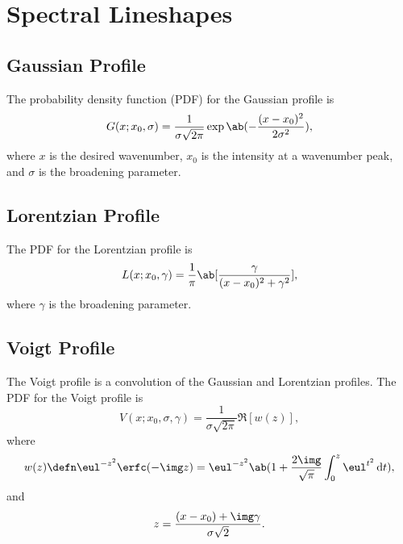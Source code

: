 \chapter{Spectral Lineshapes}
\label{c:spectral_lineshapes}

\section{Gaussian Profile}
\label{s:gaussian_profile}

The probability density function (PDF) for the Gaussian profile is
\begin{equation*}
    G(x; x_0, \sigma) = \frac{1}{\sigma\sqrt{2\pi}}\exp\ab(-\frac{(x - x_0)^2}{2\sigma^2}),
\end{equation*}
where $x$ is the desired wavenumber, $x_0$ is the intensity at a wavenumber peak, and $\sigma$ is the broadening parameter.

\section{Lorentzian Profile}
\label{s:lorentzian_profile}

The PDF for the Lorentzian profile is
\begin{equation*}
    L(x; x_0, \gamma) = \frac{1}{\pi}\ab[\frac{\gamma}{(x - x_0)^2 + \gamma^2}],
\end{equation*}
where $\gamma$ is the broadening parameter.

\section{Voigt Profile}
\label{s:voigt_profile}

The Voigt profile is a convolution of the Gaussian and Lorentzian profiles. The PDF for the Voigt profile is
\begin{equation*}
    V(x; x_0, \sigma, \gamma) = \frac{1}{\sigma\sqrt{2\pi}}\Re[w(z)],
\end{equation*}
where
\begin{equation*}
    w(z) \defn \eul^{-z^2}\erfc(-\img z) = \eul^{-z^2}\ab(1 + 
    \frac{2\img}{\sqrt{\pi}}\int_0^z \eul^{t^2} \odif{t}),
\end{equation*}
and
\begin{equation*}
    z = \frac{(x - x_0) + \img\gamma}{\sigma\sqrt{2}}.
\end{equation*}

\begin{figure}[H]
    \centering
\end{figure}

